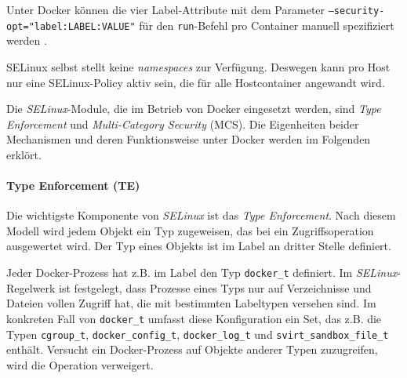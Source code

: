 \documentclass[../main.tex]{subfiles}
\begin{document}
				Unter Docker können die vier Label-Attribute mit dem Parameter \texttt{--security-opt="label:LABEL:VALUE"} für den \texttt{run}-Befehl pro Container manuell spezifiziert werden \cite{dockerRun}.


				SELinux selbst stellt keine \emph{namespaces} zur Verfügung. Deswegen kann pro Host nur eine SELinux-Policy aktiv sein, die für alle Hostcontainer angewandt wird.

				Die \emph{SELinux}-Module, die im Betrieb von Docker eingesetzt werden, sind \emph{Type Enforcement} und \emph{Multi-Category Security} (MCS). Die Eigenheiten beider Mechanismen und deren Funktionsweise unter Docker werden im Folgenden erklört.



				\paragraph{Type Enforcement (TE)}
					Die wichtigste Komponente von \emph{SELinux} ist das \emph{Type Enforcement}. Nach diesem Modell wird jedem Objekt ein Typ zugeweisen, das bei ein Zugriffsoperation ausgewertet wird. Der Typ eines Objekts ist im Label an dritter Stelle definiert.

					Jeder Docker-Prozess hat z.B. im Label den Typ \texttt{docker\_t} definiert. Im \emph{SELinux}-Regelwerk ist festgelegt, dass Prozesse eines Typs nur auf Verzeichnisse und Dateien vollen Zugriff hat, die mit bestimmten Labeltypen versehen sind. Im konkreten Fall von \texttt{docker\_t} umfasst diese Konfiguration ein Set, das z.B. die Typen \texttt{cgroup\_t}, \texttt{docker\_config\_t}, \texttt{docker\_log\_t} und \texttt{svirt\_sandbox\_file\_t} enthält. Versucht ein Docker-Prozess auf Objekte anderer Typen zuzugreifen, wird die Operation verweigert.
\end{document}
